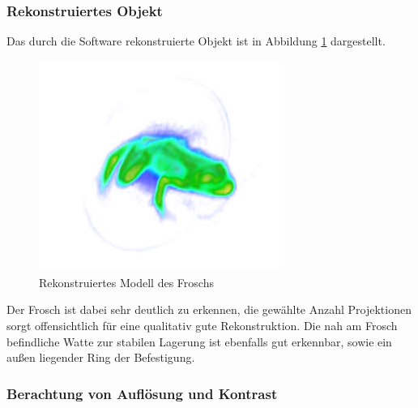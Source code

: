 \documentclass[11pt, a4paper]{article}
\numberwithin{equation}{section}
\begin{document}
\subsubsection{Rekonstruiertes Objekt}
Das durch die Software rekonstruierte Objekt ist in Abbildung \ref{fig:ct_frosch} dargestellt.
\begin{figure}[ht]
	\centering
	\includegraphics[width=0.7\textwidth]{./figures/ct/frosch.jpg}
	\caption{Rekonstruiertes Modell des Froschs}
	\label{fig:ct_frosch}
\end{figure}
Der Frosch ist dabei sehr deutlich zu erkennen, die gewählte Anzahl Projektionen sorgt offensichtlich für eine qualitativ gute Rekonstruktion.
Die nah am Frosch befindliche Watte zur stabilen Lagerung ist ebenfalls gut erkennbar, sowie ein außen liegender Ring der Befestigung.

\subsubsection{Berachtung von Auflösung und Kontrast}
\end{document}
